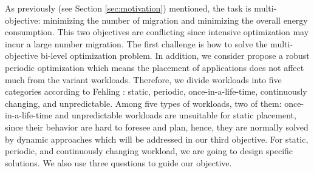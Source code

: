 As previously (see Section  \ref{sec:motivation}) mentioned, the task is multi-objective: minimizing the number of migration and minimizing the overall energy consumption. This two objectives are conflicting since intensive optimization may incur a large number migration. The first challenge is how to solve the multi-objective bi-level optimization problem. In addition, we consider propose a robust periodic optimization which means the placement of applications does not affect much from the variant workloads. Therefore, we divide workloads into five categories according to Fehling \cite{Fehling:2014tl}: static, periodic, once-in-a-life-time, continuously changing, and unpredictable. Among five types of workloads, two of them:  once-in-a-life-time and unpredictable workloads are unsuitable for static placement, since their behavior are hard to foresee and plan, hence, they are normally solved by dynamic approaches which will be addressed in our third objective.  For static, periodic, and continuously changing workload, we are going to design specific solutions. We also use three questions to guide our objective.

